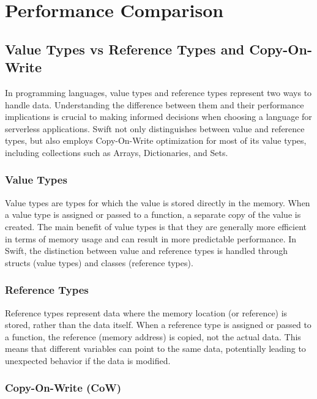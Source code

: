 \chapter{Performance Comparison}
\etocsettocstyle{\rule{\textwidth}{1pt}}{\rule{\textwidth}{1pt}} %
\localtableofcontents
\section{Value Types vs Reference Types and Copy-On-Write}

In programming languages, value types and reference types represent two ways to handle data. Understanding the difference between them and their performance implications is crucial to making informed decisions when choosing a language for serverless applications. Swift not only distinguishes between value and reference types, but also employs Copy-On-Write optimization for most of its value types, including collections such as Arrays, Dictionaries, and Sets.

\subsection{Value Types}

Value types are types for which the value is stored directly in the memory. When a value type is assigned or passed to a function, a separate copy of the value is created. The main benefit of value types is that they are generally more efficient in terms of memory usage and can result in more predictable performance. In Swift, the distinction between value and reference types is handled through structs (value types) and classes (reference types).

\subsection{Reference Types}

Reference types represent data where the memory location (or reference) is stored, rather than the data itself. When a reference type is assigned or passed to a function, the reference (memory address) is copied, not the actual data. This means that different variables can point to the same data, potentially leading to unexpected behavior if the data is modified.

\subsection{Copy-On-Write (CoW)}

